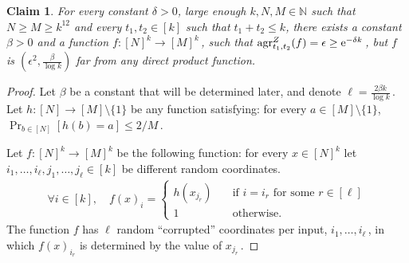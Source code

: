 \documentclass[11pt]{article}
\numberwithin{equation}{section}
\newtheorem{claim}[theorem]{Claim}
\theoremstyle{definition}
\theoremstyle{plain}
\newcommand{\eee}{\mathrm e}
\newcommand\f{f} %
\newcommand\h{h} %
\newcommand{\test}[2]{
	\ifx &#2&
	\textrm{agr}^{#1}
	\else	
	\textrm{agr}^{#1}_{#2}
	\fi}
\begin{document}
\begin{claim}\label{claim:lower bound k2}
	For every constant $\delta >0$, large enough $k,N,M\in\mathbb{N}$ such that $N\geq M\geq k^{12}$ and every $t_1,t_2\in[k]$ such that $t_1+t_2\leq k$, there exists a constant $\beta>0$ and a function $\f:[N]^k\rightarrow[M]^k$\,, such that $\test{Z}{t_1,t_2}(\f)= \epsilon\geq \eee^{-\delta k}$\,, but $\f$ is $(\epsilon^2, \frac{\beta}{\log k})$ far from any direct product function.
\end{claim}
\begin{proof}
    Let $\beta$ be a constant that will be determined later, and denote $\ell = \frac{2\beta k}{\log k}$\,.
    Let $\h:[N]\rightarrow[M]\setminus\{1\}$ be any function satisfying: for every $a\in[M]\setminus\{1\}$, $\Pr_{b\in[N]}[\h(b)=a]\leq 
    2/M$\,. %
    
    Let $\f:[N]^k\rightarrow[M]^k$ be the following function: for every $x\in[N]^k$ let $i_1,\ldots, i_{\ell},j_1,\ldots,  j_{\ell}\in [k]$ be different random coordinates.
    \begin{align*}
        \forall i\in[k],\quad \f(x)_i = \begin{cases}
    \h(x_{j_r}) \quad &\textrm{if }i=i_r \textrm{ for some } r\in[\ell]\\
    1 \quad&\textrm{otherwise.}
    \end{cases}
    \end{align*}
    The function $\f$ has $\ell$ random ``corrupted'' coordinates per input, $i_1,\ldots, i_\ell$\,, in which $\f(x)_{i_r}$ is determined by the value of $x_{j_r}$\,.
    

\end{proof}
\end{document}
